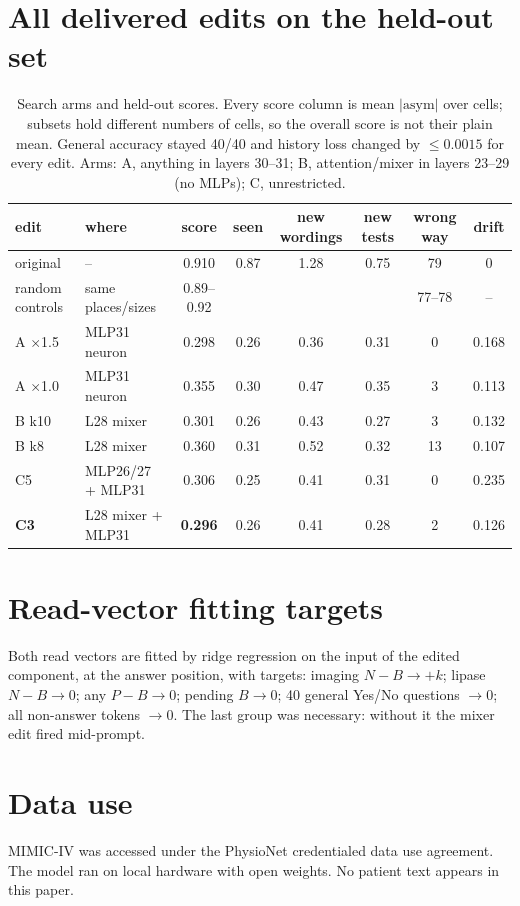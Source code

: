 \documentclass[10pt]{article}
\newcommand{\asym}{\mathrm{asym}}
\begin{document}



\appendix
\section{All delivered edits on the held-out set}\label{app:edits}

\begin{table}[h]
\centering\small
\caption{Search arms and held-out scores. Every score column is mean $|\asym|$ over cells; subsets hold different numbers of cells, so the overall score is not their plain mean. General accuracy stayed 40/40 and history loss changed by $\le 0.0015$ for every edit. Arms: A, anything in layers 30--31; B, attention/mixer in layers 23--29 (no MLPs); C, unrestricted.}
\setlength{\tabcolsep}{3.5pt}\footnotesize
\begin{tabular}{llcccccc}
\toprule
edit & where & score & seen & new wordings & new tests & wrong way & drift \\
\midrule
original & -- & 0.910 & 0.87 & 1.28 & 0.75 & 79 & 0 \\
random controls & same places/sizes & 0.89--0.92 & & & & 77--78 & -- \\
A $\times$1.5 & MLP31 neuron & 0.298 & 0.26 & 0.36 & 0.31 & 0 & \textcolor{posc}{0.168} \\
A $\times$1.0 & MLP31 neuron & 0.355 & 0.30 & 0.47 & 0.35 & 3 & 0.113 \\
B k10 & L28 mixer & 0.301 & 0.26 & 0.43 & 0.27 & 3 & 0.132 \\
B k8  & L28 mixer & 0.360 & 0.31 & 0.52 & 0.32 & 13 & 0.107 \\
C5 & MLP26/27 + MLP31 & 0.306 & 0.25 & 0.41 & 0.31 & 0 & \textcolor{posc}{0.235} \\
\textbf{C3} & L28 mixer + MLP31 & \textbf{0.296} & 0.26 & 0.41 & 0.28 & 2 & 0.126 \\
\bottomrule
\end{tabular}
\end{table}

\section{Read-vector fitting targets}
Both read vectors are fitted by ridge regression on the input of the edited component, at the answer position, with targets: imaging $N - B \to +k$; lipase $N - B \to 0$; any $P - B \to 0$; pending $B \to 0$; 40 general Yes/No questions $\to 0$; all non-answer tokens $\to 0$. The last group was necessary: without it the mixer edit fired mid-prompt.

\section{Data use}
MIMIC-IV was accessed under the PhysioNet credentialed data use agreement. The model ran on local hardware with open weights. %
No patient text appears in this paper.
\end{document}
